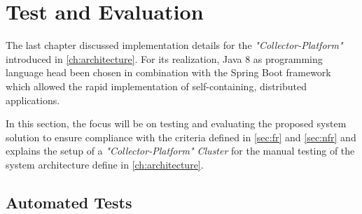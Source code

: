 \chapter{Test and Evaluation}
\label{ch:evaluation}
%
%

The last chapter discussed implementation details for the \textit{"Collector-Platform"} introduced in \autoref{ch:architecture}.
For its realization, Java 8 as programming language head been chosen in combination with the Spring Boot framework which allowed
the rapid implementation of self-containing, distributed applications.

In this section, the focus will be on testing and evaluating the proposed system solution to ensure compliance with the criteria
defined in \autoref{sec:fr} and \autoref{sec:nfr} and explains the setup of a \textit{"Collector-Platform" Cluster} for the manual
testing of the system architecture define in \autoref{ch:architecture}.

\section{Automated Tests}

